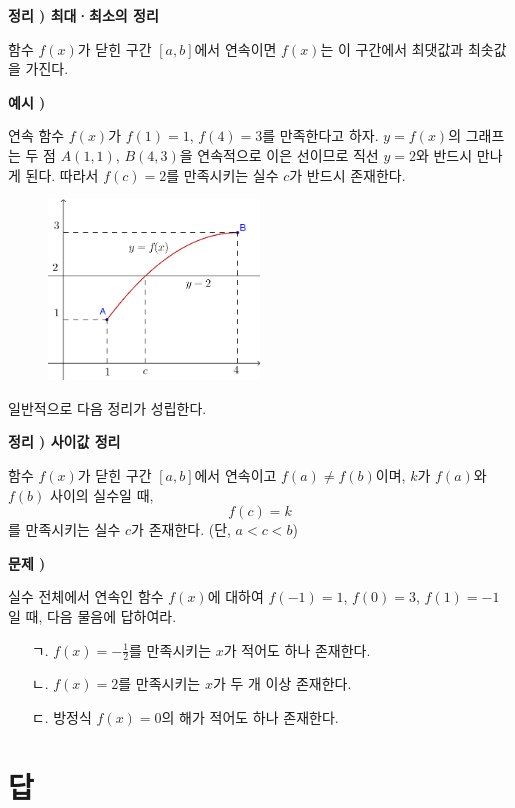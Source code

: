 \documentclass{oblivoir}
\newcounter{num}
\newcommand\theo[1]
{\bigskip\par\noindent\stepcounter{num} \textbf{정리 \thenum) #1}\par\noindent}
\newcommand\exam[1]
{\bigskip\par\noindent\stepcounter{num} \textbf{예시 \thenum) #1}\par\noindent}
\newcommand\prob[1]
{\bigskip\par\noindent\stepcounter{num} \textbf{문제 \thenum) #1}\par\noindent}
\let\oldsection\section
\renewcommand\section{\clearpage\oldsection}
\begin{document}
\begin{mdframed}
%
\theo{최대·최소의 정리}
함수 \(f(x)\)가 닫힌 구간 \([a,b]\)에서 연속이면 \(f(x)\)는 이 구간에서 최댓값과 최솟값을 가진다.
\end{mdframed}
\bigskip

\clearpage

%
\exam{}
연속 함수 \(f(x)\)가 \(f(1)=1\), \(f(4)=3\)를 만족한다고 하자.
\(y=f(x)\)의 그래프는 두 점 \(A(1,1)\), \(B(4,3)\)을 연속적으로 이은 선이므로 직선 \(y=2\)와 반드시 만나게 된다.
따라서 \(f(c)=2\)를 만족시키는 실수 \(c\)가 반드시 존재한다.

\begin{figure}[h!]
\centering
\includegraphics[width=0.5\textwidth]{intermediate_value}
\end{figure}

일반적으로 다음 정리가 성립한다.
\medskip

\begin{mdframed}
%
\theo{사이값 정리}
함수 \(f(x)\)가 닫힌 구간 \([a,b]\)에서 연속이고 \(f(a)\neq f(b)\)이며, \(k\)가 \(f(a)\)와 \(f(b)\) 사이의 실수일 때,
\[f(c)=k\]
를 만족시키는 실수 \(c\)가 존재한다.
(단, \(a<c<b\))
\end{mdframed}
\bigskip

%
\prob{}
실수 전체에서 연속인 함수 \(f(x)\)에 대하여 \(f(-1)=1\), \(f(0)=3\), \(f(1)=-1\)일 때, 다음 물음에 답하여라.
\begin{enumerate}
\item[ㄱ.]
\(f(x)=-\frac12\)를 만족시키는 \(x\)가 적어도 하나 존재한다.
\item[ㄴ.]
\(f(x)=2\)를 만족시키는 \(x\)가 두 개 이상 존재한다.
\item[ㄷ.]
방정식 \(f(x)=0\)의 해가 적어도 하나 존재한다.
\end{enumerate}

\section*{답}
\end{document}
